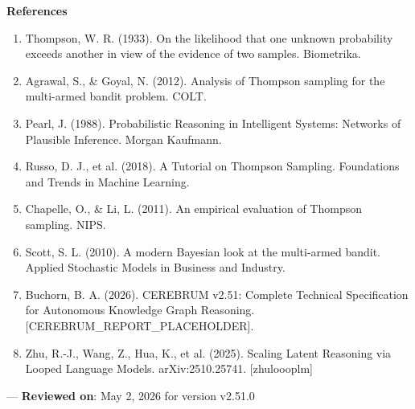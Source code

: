 \textbf{References}
\begin{enumerate}
\item Thompson, W. R. (1933). On the likelihood that one unknown probability exceeds another in view of the evidence of two samples. Biometrika.
\item Agrawal, S., \& Goyal, N. (2012). Analysis of Thompson sampling for the multi-armed bandit problem. COLT.
\item Pearl, J. (1988). Probab\-ilistic Reasoning in Intelligent Systems: Networks of Plausible Inference. Morgan Kaufmann.
\item Russo, D. J., et al. (2018). A Tutorial on Thompson Sampling. Foundations and Trends in Machine Learning.
\item Chapelle, O., \& Li, L. (2011). An empirical evaluation of Thompson sampling. NIPS.
\item Scott, S. L. (2010). A modern Bayesian look at the multi-armed bandit. Applied Stochastic Models in Business and Industry.
\item Buchorn, B. A. (2026). CEREBRUM v2.51: Complete Technical Specif\-ication for Autonomous Knowledge Graph Reasoning. [CEREBRUM\_REPORT\_PLACEHOLDER].
\item Zhu, R.-J., Wang, Z., Hua, K., et al. (2025). Scaling Latent Reasoning via Looped Language Models. arXiv:2510.25741. [zhu\-loooplm]

\end{enumerate}
---
\textbf{Reviewed on}: May 2, 2026 for version v2.51.0
